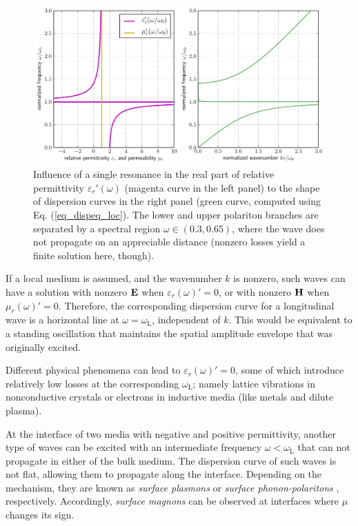 \begin{figure}[t] \caption{Influence of a single resonance in the real part of relative permittivity $\varepsilon_r'(\omega)$ (magenta curve in the left panel) to the shape of dispersion curves in the right panel (green curve, computed using Eq. (\ref{eq_dispeq_loc}). The lower and upper polariton branches are separated by a spectral region $\omega \in (0.3, 0.65)$, where the wave does not propagate on an appreciable distance (nonzero losses yield a finite solution here, though).} \label{fg_dcsimpleel} \centering  %
	\includegraphics[width=17cm]{img/dispersion_landau_lifshitz/dispersion_simple_el.pdf}
\end{figure}
If a local medium is assumed, and the wavenumber $k$ is nonzero, such waves can have a solution with nonzero $\mathbf{E}$ when $\varepsilon_r(\omega)' = 0$, or with nonzero $\mathbf{H}$ when $\mu_r(\omega)' = 0$. Therefore, the corresponding dispersion curve for a longitudinal wave is a horizontal line at $\omega = \omega_{\text{L}}$, independent of $k$. This would be equivalent to a standing oscillation that maintains the spatial amplitude envelope that was originally excited. 

Different physical phenomena can lead to $\varepsilon_r(\omega)' = 0$, some of which introduce relatively low losses at the corresponding $\omega_{\text{L}}$; namely lattice vibrations in nonconductive crystals or electrons in inductive media (like metals and dilute plasma). 

At the interface of two media with negative and positive permittivity, another type of waves can be excited with an intermediate frequency $\omega < \omega_{\text{L}}$ that can not propagate in either of the bulk medium. The dispersion curve of such waves is not flat, allowing them to propagate along the interface. Depending on the mechanism, they are known as  \textit{surface plasmons} or \textit{surface phonon-polaritons} \cite[p. 87]{klingshirn2007semiconductor}, respectively. Accordingly, \textit{surface magnons} can be observed at interfaces where $\mu$ changes its sign.
